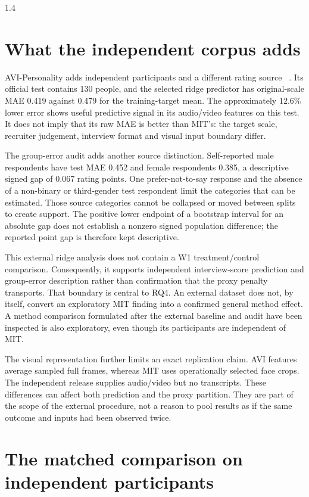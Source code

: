 \begin{spacing}{1.4}
\section{What the independent corpus adds}

AVI-Personality adds independent participants and a different rating source
~\cite{Zhang2026AVI}. Its official test contains 130 people, and the selected ridge
predictor has original-scale MAE 0.419 against 0.479 for the training-target mean.
The approximately 12.6\% lower error shows useful predictive signal in its audio/video
features on this test. It does not imply that its raw MAE is better than MIT's:
the target scale, recruiter judgement, interview format and visual input boundary differ.

The group-error audit adds another source distinction. Self-reported male respondents
have test MAE 0.452 and female respondents 0.385, a descriptive signed gap of 0.067
rating points. One prefer-not-to-say response and the absence of a non-binary or
third-gender test respondent limit the categories that can be estimated. Those source
categories cannot be collapsed or moved between splits to create support. The positive
lower endpoint of a bootstrap interval for an absolute gap does not establish a nonzero
signed population difference; the reported point gap is therefore kept descriptive.

This external ridge analysis does not contain a W1 treatment/control comparison.
Consequently, it supports independent interview-score prediction and group-error
description rather than confirmation that the proxy penalty transports. That boundary
is central to RQ4. An external dataset does not, by itself, convert an exploratory MIT
finding into a confirmed general method effect. A method comparison formulated after
the external baseline and audit have been inspected is also exploratory, even though
its participants are independent of MIT.

The visual representation further limits an exact replication claim. AVI features
average sampled full frames, whereas MIT uses operationally selected face crops.
The independent release supplies audio/video but no transcripts. These differences can
affect both prediction and the proxy partition. They are part of the scope of the
external procedure, not a reason to pool results as if the same outcome and inputs had
been observed twice.


\section{The matched comparison on independent participants}


\end{spacing}
